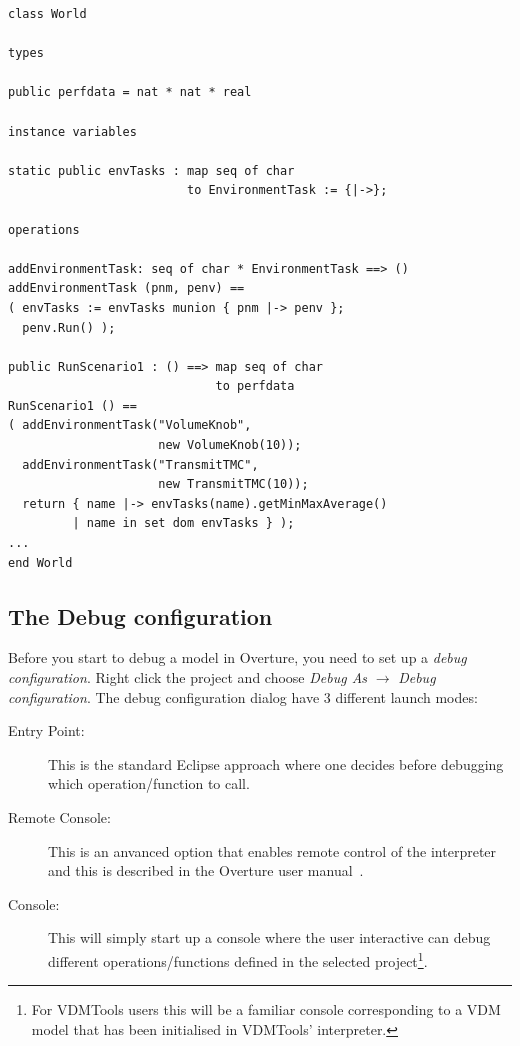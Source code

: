 \begin{lstlisting}
class World

types
  
public perfdata = nat * nat * real

instance variables

static public envTasks : map seq of char 
                         to EnvironmentTask := {|->};

operations

addEnvironmentTask: seq of char * EnvironmentTask ==> ()
addEnvironmentTask (pnm, penv) ==
( envTasks := envTasks munion { pnm |-> penv };
  penv.Run() );

public RunScenario1 : () ==> map seq of char 
                             to perfdata
RunScenario1 () ==
( addEnvironmentTask("VolumeKnob", 
                     new VolumeKnob(10));
  addEnvironmentTask("TransmitTMC", 
                     new TransmitTMC(10));
  return { name |-> envTasks(name).getMinMaxAverage() 
         | name in set dom envTasks } );
...
end World
\end{lstlisting}

\subsection{The Debug configuration}\label{sec:debugconfig}

Before you start to debug a model in Overture, you need to set up a
\emph{debug configuration}. Right click the project and choose
\emph{Debug As} $ \rightarrow $ \emph{Debug configuration}.
The debug configuration
dialog have 3 different launch modes:

\begin{description}
\item[Entry Point:] This is the standard Eclipse approach where one
  decides before debugging which operation/function to call.
\item[Remote Console:] This is an anvanced option that enables remote
  control of the interpreter and this is described in the Overture
  user manual~\cite{Larsen&10d}.
\item[Console:] This will simply start up a console where the user
  interactive can debug different operations/functions defined in the
  selected project\footnote{For VDMTools users this will be a familiar
    console corresponding to a VDM model that has been initialised in
    VDMTools' interpreter.}.
\end{description}

